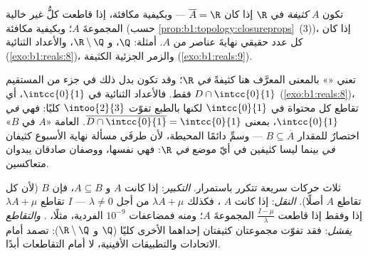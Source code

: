 \begin{definition}\label{def:b1:topology:dense}
تكون $A$ \emph{كثيفة} في $\R$ إذا كان $\overline A = \R$
--- وبكيفية مكافئة، إذا قاطعت كلُّ   غير خالية المجموعةَ $A$؛
وبكيفية مكافئة (حسب \cref{prop:b1:topology:closureprops}~(3))، إذا كان كل
عدد حقيقي نهايةَ عناصر من $A$. أمثلة: $\Q$، و $\R \setminus
\Q$، والأعداد الثنائية (\cref{exo:b1:reals:8})، والزمر الجزئية الكثيفة
(\cref{exo:b1:reals:9}).
\end{definition}

\begin{example}\label{ex:b1:topology:relativedensity}
تعني «» بالمعنى المعرَّف هنا كثيفةً \emph{في $\R$}؛ وقد تكون
 بدل ذلك  في جزء من المستقيم فقط. فالأعداد الثنائية في
$\intcc{0}{1}$، أي $D \cap \intcc{0}{1}$
(\cref{exo:b1:reals:8})، تقاطع كل   محتواة في
$\intcc{0}{1}$ لكنها بالطبع تفوّت $\intoo{2}{3}$ كليًا: فهي
 \emph{في} $\intcc{0}{1}$، بمعنى $\overline{D \cap
\intcc{0}{1}} = \intcc{0}{1}$.  العامة «$A$ 
في $B$» اختصارٌ للمقدار $B \subseteq \overline A$ --- وسمِّ دائمًا
 المحيطة، لأن طرفَي مسألة نهاية الأسبوع كثيفان
\emph{في } بينما ليسا كثيفين في أيّ موضع \emph{في
$\R$}: فهي  نفسها، ووصفان صادقان يبدوان متعاكسين.
\end{example}

\begin{example}\label{ex:b1:topology:densitytricks}
ثلاث حركات سريعة تتكرر باستمرار. \emph{التكبير}: إذا كانت
$A$  و $A \subseteq B$، فإن $B$  (لأن كل
 تقاطع $A$ أصلًا). \emph{النقل}: إذا كانت $A$
، فكذلك $\lambda A + \mu$ من أجل $\lambda \neq 0$ --- 
$I$ تقاطع $\lambda A + \mu$ إذا وفقط إذا قاطعت 
$\frac{I - \mu}{\lambda}$ المجموعةَ $A$؛ ومنه فمضاعفات
$10^{-9}$ الفردية، مثلًا، . \emph{والتقاطع يفشل}: فقد تفوّت مجموعتان
كثيفتان إحداهما الأخرى كليًا ($\Q$ و $\R \setminus \Q$):
 تصمد أمام الاتحادات والتطبيقات الأفينية، لا أمام التقاطعات أبدًا.
\end{example}

